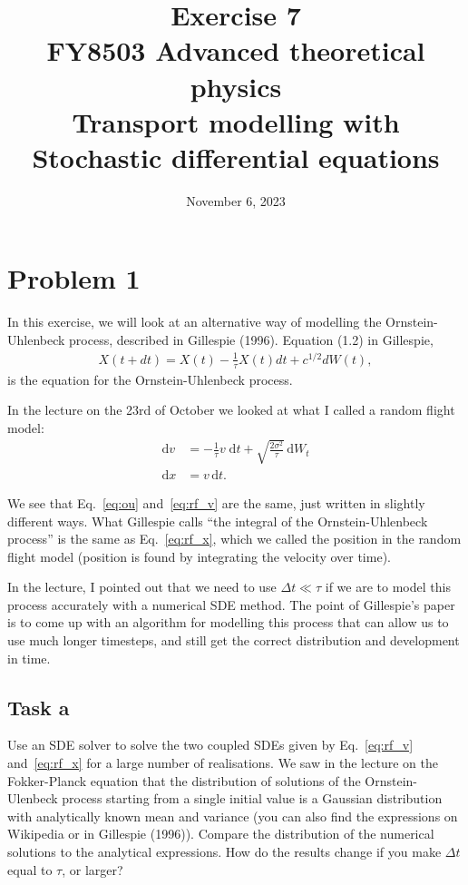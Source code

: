 \documentclass[a4paper]{article}
\title{\vspace{-3em} Exercise 7\\[10pt] \large FY8503 Advanced theoretical physics\\  Transport modelling with Stochastic differential equations}
\author{November 6, 2023}
\date{}
\begin{document}
\maketitle



\section*{Problem 1}

In this exercise, we will look at an alternative way of modelling the Ornstein-Uhlenbeck process, described in Gillespie (1996). Equation (1.2) in Gillespie,
\begin{align}
    \label{eq:ou}
    X(t + dt) = X(t) - \frac{1}{\tau} X(t) dt + c^{1/2} dW(t),
\end{align}
is the equation for the Ornstein-Uhlenbeck process.

In the lecture on the 23rd of October we looked at what I called a random flight model:
\begin{subequations}
\begin{align}
    \label{eq:rf_v}
    \mathrm{d} v &= - \frac{1}{\tau}v \; \mathrm{d} t +  \sqrt{\frac{2\sigma^2}{\tau}} \, \mathrm{d} W_t \\
    \label{eq:rf_x}
    \mathrm{d} x &= v \, \mathrm{d} t.
\end{align}
\end{subequations}

We see that Eq.~\eqref{eq:ou} and~\eqref{eq:rf_v} are the same, just written in slightly different ways. What Gillespie calls ``the integral of the Ornstein-Uhlenbeck process'' is the same as Eq.~\eqref{eq:rf_x}, which we called the position in the random flight model (position is found by integrating the velocity over time).

In the lecture, I pointed out that we need to use $\Delta t \ll \tau$ if we are to model this process accurately with a numerical SDE method. The point of Gillespie's paper is to come up with an algorithm for modelling this process that can allow us to use much longer timesteps, and still get the correct distribution and development in time.


\subsection*{Task a}

Use an SDE solver to solve the two coupled SDEs given by Eq.~\eqref{eq:rf_v} and~\eqref{eq:rf_x} for a large number of realisations. We saw in the lecture on the Fokker-Planck equation that the distribution of solutions of the Ornstein-Ulenbeck process starting from a single initial value is a Gaussian distribution with analytically known mean and variance (you can also find the expressions on Wikipedia or in Gillespie (1996)). Compare the distribution of the numerical solutions to the analytical expressions. How do the results change if you make $\Delta t$ equal to $\tau$, or larger?
\end{document}
